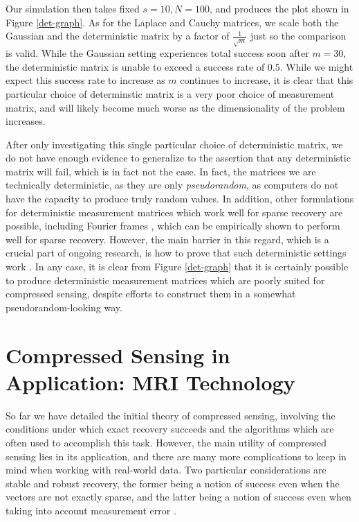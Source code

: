\documentclass[12pt,a4paper]{amsart}
\numberwithin{equation}{section}
\theoremstyle{plain}
\theoremstyle{definition}
\begin{document}
Our simulation then takes fixed $s=10,N=100$, and produces the plot shown in Figure \ref{det-graph}. As for the Laplace and Cauchy matrices, we scale both the Gaussian and the deterministic matrix by a factor of $\frac{1}{\sqrt{m}}$ just so the comparison is valid. While the Gaussian setting experiences total success soon after $m=30$, the deterministic matrix is unable to exceed a success rate of 0.5. While we might expect this success rate to increase as $m$ continues to increase, it is clear that this particular choice of determinstic matrix is a very poor choice of measurement matrix, and will likely become much worse as the dimensionality of the problem increases.

After only investigating this single particular choice of deterministic matrix, we do not have enough evidence to generalize to the assertion that any deterministic matrix will fail, which is in fact not the case. In fact, the matrices we are technically deterministic, as they are only \textit{pseudorandom}, as computers do not have the capacity to produce truly random values. In addition, other formulations for deterministic measurement matrices which work well for sparse recovery are possible, including Fourier frames \cite{fou-rau}, which can be empirically shown to perform well for sparse recovery. However, the main barrier in this regard, which is a crucial part of ongoing research, is how to prove that such deterministic settings work \cite{fou-rau}. In any case, it is clear from Figure \ref{det-graph} that it is certainly possible to produce deterministic measurement matrices which are poorly suited for compressed sensing, despite efforts to construct them in a somewhat pseudorandom-looking way.

\section{Compressed Sensing in Application: MRI Technology}\label{app}

So far we have detailed the initial theory of compressed sensing, involving the conditions under which exact recovery succeeds and the algorithms which are often used to accomplish this task. However, the main utility of compressed sensing lies in its application, and there are many more complications to keep in mind when working with real-world data. Two particular considerations are stable and robust recovery, the former being a notion of success even when the vectors are not exactly sparse, and the latter being a notion of success even when taking into account measurement error \cite{fou-rau}.
\end{document}
